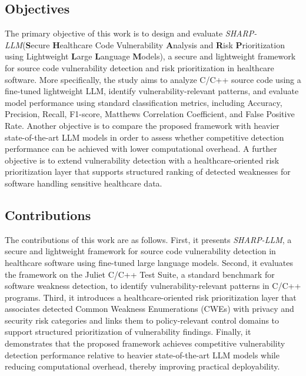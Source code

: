\documentclass[conference]{IEEEtran}
\begin{document}
\subsection{Objectives}
The primary objective of this work is to design and evaluate \textit{SHARP-LLM}(\textbf{S}ecure \textbf{H}ealthcare Code Vulnerability \textbf{A}nalysis and \textbf{R}isk \textbf{P}rioritization using Lightweight \textbf{L}arge \textbf{L}anguage \textbf{M}odels), a secure and lightweight framework for source code vulnerability detection and risk prioritization in healthcare software. More specifically, the study aims to analyze C/C++ source code using a fine-tuned lightweight LLM, identify vulnerability-relevant patterns, and evaluate model performance using standard classification metrics, including Accuracy, Precision, Recall, F1-score, Matthews Correlation Coefficient, and False Positive Rate. Another objective is to compare the proposed framework with heavier state-of-the-art LLM models in order to assess whether competitive detection performance can be achieved with lower computational overhead. A further objective is to extend vulnerability detection with a healthcare-oriented risk prioritization layer that supports structured ranking of detected weaknesses for software handling sensitive healthcare data.

\subsection{Contributions}
The contributions of this work are as follows. First, it presents \textit{SHARP-LLM}, a secure and lightweight framework for source code vulnerability detection in healthcare software using fine-tuned large language models. Second, it evaluates the framework on the Juliet C/C++ Test Suite, a standard benchmark for software weakness detection, to identify vulnerability-relevant patterns in C/C++ programs. Third, it introduces a healthcare-oriented risk prioritization layer that associates detected Common Weakness Enumerations (CWEs) with privacy and security risk categories and links them to policy-relevant control domains to support structured prioritization of vulnerability findings. Finally, it demonstrates that the proposed framework achieves competitive vulnerability detection performance relative to heavier state-of-the-art LLM models while reducing computational overhead, thereby improving practical deployability.
\end{document}
